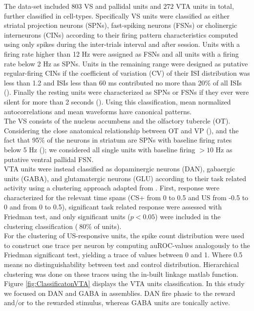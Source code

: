 The data-set included $803$ VS and pallidal units and $272$ VTA units in total, further classified in cell-types. Specifically VS units were classified as either striatal projection neurons (SPNs), fast-spiking neurons (FSNs) or cholinergic interneurons (CINs) according to their firing pattern characteristics computed using only spikes during the inter-trials interval and after session. Units with a firing rate higher than 12 Hz were assigned as FSNs and all units with a firing rate below 2 Hz as SPNs. Units in the remaining range were designed as putative regular-firing CINs if the coefficient of variation (CV) of their ISI distribution was less than 1.2 and ISIs less than 60 ms contributed no more than 20$\%$ of all ISIs (\cite{Inokawa}). Finally the resting units were characterized as SPNs or FSNs if they ever were silent for more than 2 seconds (\cite{Graybiel}). Using this classification, mean normalized autocorrelations and mean waveforms have canonical patterns.\\The VS consists of the nucleus accumbens and the olfactory tubercle (OT). Considering the close anatomical relationship between OT and VP (\cite{Heimer1982}), and  the fact that 95$\%$ of the neurons in striatum are SPNs with baseline firing rates below 5 Hz (\cite{Kravitz}); we considered all single units with baseline firing $> 10$ Hz as putative ventral pallidal FSN.\\VTA units were instead classified as dopaminergic neurons (DAN), gabaergic units (GABA), and glutamatergic neurons (GLU) according to their task related activity using a clustering approach adapted from \cite{Uchida}. First, response were characterized for the relevant time spans (CS+ from 0 to 0.5 and US from -0.5 to 0 and from 0 to 0.5), significant task related response were assessed with Friedman test, and only significant units ($p<0.05$) were included in the clustering classification ($~80\%$ of units).\\For the clustering of US-responsive units, the spike count distribution were used to construct one trace per neuron by computing auROC-values analogously to the Friedman significant test, yielding a trace of values between 0 and 1. Where 0.5 means no distinguishability between test and control distribution. Hierarchical clustering was done on these traces using the in-built linkage matlab function.\\Figure \ref{fig:ClassificatonVTA} displays the VTA units classification. In this study we focused on DAN and GABA in assemblies. DAN fire phasic to the reward and/or to the rewarded stimulus, whereas GABA units are tonically active.

